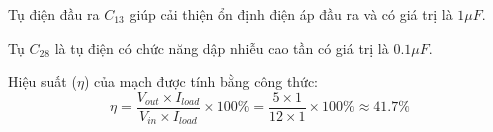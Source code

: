 Tụ điện đầu ra $C_{13}$ giúp cải thiện ổn định điện áp đầu ra và có giá trị là $1\mu F$.

Tụ $C_{28}$ là tụ điện có chức năng dập nhiễu cao tần có giá trị là $0.1\mu F$.

Hiệu suất ($\eta$) của mạch được tính bằng công thức: \[ \eta = \dfrac{V_{out}\times I_{load}}{V_{in} \times I_{load}}\times 100\% = \dfrac{5\times 1}{12 \times 1}\times 100\% \approx 41.7\% \]

%
%
%
%
